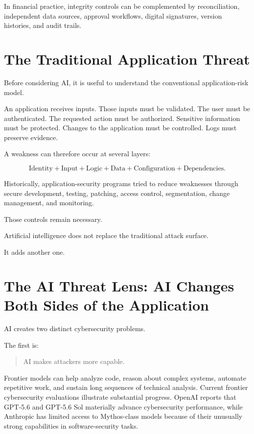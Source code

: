 In financial practice, integrity controls can be complemented by reconciliation, independent data sources, approval workflows, digital signatures, version histories, and audit trails.

\section{The Traditional Application Threat}

Before considering AI, it is useful to understand the conventional application-risk model.

An application receives inputs. Those inputs must be validated. The user must be authenticated. The requested action must be authorized. Sensitive information must be protected. Changes to the application must be controlled. Logs must preserve evidence.

A weakness can therefore occur at several layers:

\begin{equation}
\text{Identity}
+
\text{Input}
+
\text{Logic}
+
\text{Data}
+
\text{Configuration}
+
\text{Dependencies}.
\end{equation}

Historically, application-security programs tried to reduce weaknesses through secure development, testing, patching, access control, segmentation, change management, and monitoring.

Those controls remain necessary.

Artificial intelligence does not replace the traditional attack surface.

It adds another one.

\section{The AI Threat Lens: AI Changes Both Sides of the Application}

AI creates two distinct cybersecurity problems.

The first is:

\begin{quote}
AI makes attackers more capable.
\end{quote}

Frontier models can help analyze code, reason about complex systems, automate repetitive work, and sustain long sequences of technical analysis. Current frontier cybersecurity evaluations illustrate substantial progress. OpenAI reports that GPT-5.6 and GPT-5.6 Sol materially advance cybersecurity performance, while Anthropic has limited access to Mythos-class models because of their unusually strong capabilities in software-security tasks.

